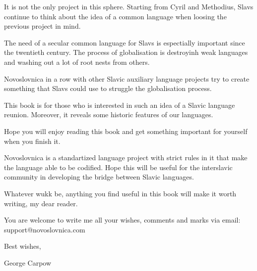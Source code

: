 It is not the only project in this sphere. Starting from Cyril and Methodius, Slavs continue to think about the idea of a common language when loosing the previous project in mind.

The need of a secular common language for Slavs is espectially important since the twentieth century. The process of globalisation is destroyinh weak languages and washing out a lot of root nests from others.

Novoslovnica in a row with other Slavic auxiliary language projects try to create something that Slavs could use to struggle the globalisation process.

This book is for those who is interested in such an idea of a Slavic language reunion. Moreover, it reveals some historic features of our languages.

Hope you will enjoy reading this book and get something important for yourself when you finish it.

Novoslovnica is a standartized language project with strict rules in it that make the language able to be codified. Hope this will be useful for the interslavic community in developing the bridge between Slavic languages.

Whatever wukk be, anything you find useful in this book will make it worth writing, my dear reader.

You are welcome to write me all your wishes, comments and marks via email: support@novoslovnica.com

Best wishes,

George Carpow